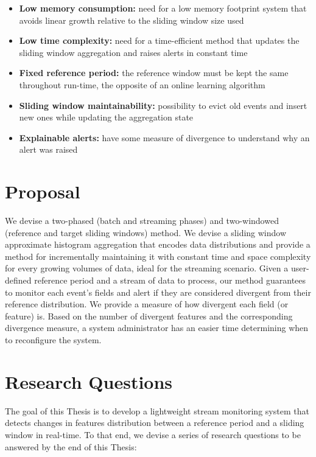\begin{itemize}
    \item \textbf{Low memory consumption:} need for a low memory footprint system that avoids linear growth relative to the sliding window size used
    
    \item \textbf{Low time complexity:} need for a time-efficient method that updates the sliding window aggregation and raises alerts in constant time
    
    \item \textbf{Fixed reference period:} the reference window must be kept the same throughout run-time, the opposite of an online learning algorithm
    
    \item \textbf{Sliding window maintainability:} possibility to evict old events and insert new ones while updating the aggregation state
    
    \item \textbf{Explainable alerts:} have some measure of divergence to understand why an alert was raised
\end{itemize}


\section{Proposal}
We devise a two-phased (batch and streaming phases) and two-windowed (reference and target sliding windows) method. We devise a sliding window approximate histogram aggregation that encodes data distributions and provide a method for incrementally maintaining it with constant time and space complexity for every growing volumes of data, ideal for the streaming scenario. Given a user-defined reference period and a stream of data to process, our method guarantees to monitor each event's fields and alert if they are considered divergent from their reference distribution. We provide a measure of how divergent each field (or feature) is. Based on the number of divergent features and the corresponding divergence measure, a system administrator has an easier time determining when to reconfigure the system.


\section{Research Questions}
The goal of this Thesis is to develop a lightweight stream monitoring system that detects changes in features distribution between a reference period and a sliding window in real-time. To that end, we devise a series of research questions to be answered by the end of this Thesis:

